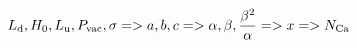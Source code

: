 \documentclass{article}
\begin{document}
\begin{enumerate}
$$ L_\textup{d} ,H_{0}, L_\textup{u}, P_\textup{vac}, \sigma => a, b, c => \alpha,  \beta, \frac{\beta^2}{\alpha} => x => N_\textup{Ca}$$


\end{enumerate}


\clearpage
%
%
\end{document}
